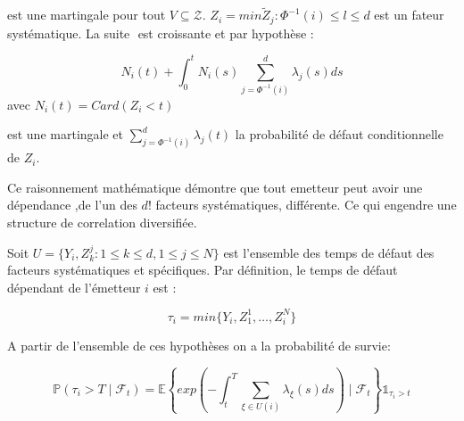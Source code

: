 \documentclass[10pt,a4paper]{article}
\begin{document}
	
	est une martingale pour tout $ V \subseteq \mathcal{Z} $. $ Z_i = min{\tilde{Z}_j : \varPhi^{-1}(i)\leq l \leq d } $ est un fateur systématique. La suite $  $ est croissante et par hypothèse : 
	
	
	$$ N_i(t) + \int_0^{t} N_i(s)  \sum_{j=\varPhi^{-1}(i)}^d \lambda_j(s)ds $$ avec $ N_i(t) = Card(Z_i<t)  $
	
	
	est une martingale et $ \sum_{j = \varPhi^{-1}(i)}^{d} \lambda_j(t) $ la probabilité de défaut conditionnelle de $ Z_i $. 
	
	Ce raisonnement mathématique démontre que tout emetteur peut avoir une dépendance ,de l'un des $ d! $ facteurs systématiques, différente. Ce qui engendre une structure de correlation diversifiée. 
	
	
	Soit $ U = \{ Y_i,Z_k^{j}: 1\leq k \leq d, 1\leq j \leq N \}  $ est l'ensemble des temps de défaut des facteurs systématiques et spécifiques. Par définition, le temps de défaut dépendant de l'émetteur $ i $ est :
	
	$$ \tau_i = min\{ Y_i,Z_1^{1},\ldots,Z_i^{N} \} $$ 
	
	A partir de l'ensemble de ces hypothèses on a la probabilité de survie:
	
	$$ \mathbb{P}(\tau_i>T \mid \mathcal{F}_t)  = \mathbb{E} \left\{ exp\left(-\int_t^T \sum_{\xi \in U(i)} \lambda_\xi(s)ds\right) \mid \mathcal{F}_t \right\} \mathds{1}_{\tau_i>t} $$
	
	
\end{document}
